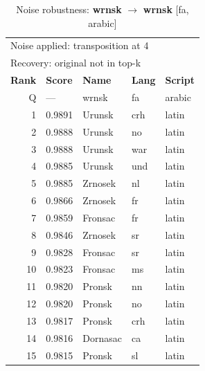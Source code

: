 \begin{table}[htbp]
\centering
\small
\caption{Noise robustness: \textbf{wrnsk} $\rightarrow$ \textbf{wrnsk} [fa, arabic]}
\label{tab:noise-5}
\begin{tabular}{rllll}
\toprule
\multicolumn{5}{l}{\small Noise applied: transposition at 4} \\
\multicolumn{5}{l}{\small Recovery: original not in top-k} \\
\midrule
\textbf{Rank} & \textbf{Score} & \textbf{Name} & \textbf{Lang} & \textbf{Script} \\
\midrule
\rowcolor{gray!20} Q & --- & wrnsk & fa & arabic \\
\midrule
1 & 0.9891 & Urunsk & crh & latin \\
2 & 0.9888 & Urunsk & no & latin \\
3 & 0.9888 & Urunsk & war & latin \\
4 & 0.9885 & Urunsk & und & latin \\
5 & 0.9885 & Zrnosek & nl & latin \\
6 & 0.9866 & Zrnosek & fr & latin \\
7 & 0.9859 & Fronsac & fr & latin \\
8 & 0.9846 & Zrnosek & sr & latin \\
9 & 0.9828 & Fronsac & sr & latin \\
10 & 0.9823 & Fronsac & ms & latin \\
11 & 0.9820 & Pronsk & nn & latin \\
12 & 0.9820 & Pronsk & no & latin \\
13 & 0.9817 & Pronsk & crh & latin \\
14 & 0.9816 & Dornasac & ca & latin \\
15 & 0.9815 & Pronsk & sl & latin \\
\bottomrule
\end{tabular}
\end{table}

